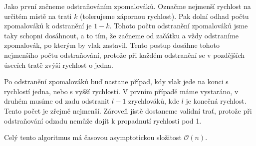 \documentclass{fkssolpub}
\author{Ondřej Sedláček}
\begin{document}
 

Jako první začneme odstraňováním zpomalováků. Označme nejmenší rychlost
na určitém místě na trati $k$ (tolerujeme zápornou rychlost). Pak dolní odhad
počtu zpomalováků k odstranění je $1 - k$. Tohoto počtu odstranění zpomalováků
jsme taky schopni dosáhnout, a to tím, že začneme od začátku a vždy odstraníme
zpomalovák, po kterým by vlak zastavil. Tento postup dosáhne tohoto nejmenšího
počtu odstraňování, protože při každém odstranění se v pozdějších úsecích
tratě zvýší rychlost o jedna.

Po odstranění zpomalováků buď nastane případ, kdy vlak jede na konci s
rychlostí jedna, nebo s vyšší rychlostí. V prvním případě máme vystaráno,
v druhém musíme od zadu odstranit $l - 1$ zrychlováků, kde $l$ je konečná
rychlost. Tento počet je zřejmě nejmenší. Zároveň jistě dostaneme validní
trať, protože při odstraňování odzadu nemůže dojít k propadnutí rychlosti
pod 1. 

Celý tento algoritmus má časovou asymptotickou složitost $\mathcal{O}(n)$.
\end{document}
